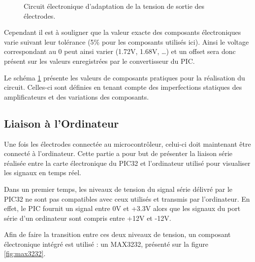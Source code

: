 \documentclass[letterpaper, twoside, 12pt, memoire, creativecommons, hyperref]{thETS}
\begin{document}
\begin{figure}
	\centering
	\caption{Circuit électronique d'adaptation de la tension de sortie des électrodes.}
	\label{fig:adapttension}
\end{figure}

Cependant il est à souligner que la valeur exacte des composants électroniques varie suivant leur tolérance (5\% pour les composants utilisés ici). Ainsi le voltage correspondant au 0 peut ainsi varier (1.72V, 1.68V, …) et un offset sera donc présent sur les valeurs enregistrées par le convertisseur du PIC. 

Le schéma \ref{fig:adapttension} présente les valeurs de composants pratiques pour la réalisation du circuit. Celles-ci sont définies en tenant compte des imperfections statiques des amplificateurs et des variations des composants.


\subsection{Liaison à l'Ordinateur}

Une fois les électrodes connectée au microcontrôleur, celui-ci doit maintenant être connecté à l'ordinateur. Cette partie a pour but de présenter la liaison série réalisée entre la carte électronique du PIC32 et l'ordinateur utilisé pour visualiser les signaux en temps réel.

Dans un premier temps, les niveaux de tension du signal série délivré par le PIC32 ne sont pas compatibles avec ceux utilisés et transmis par l'ordinateur. En effet, le PIC fournit un signal entre 0V et +3.3V alors que les signaux du port série d'un ordinateur sont compris entre +12V et -12V. 

Afin de faire la transition entre ces deux niveaux de tension, un composant électronique intégré est utilisé : un MAX3232, présenté sur la figure \ref{fig:max3232}.
\end{document}
